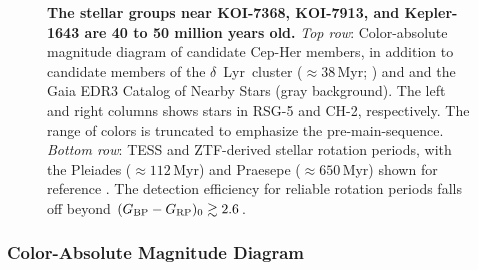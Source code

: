 \documentclass[12pt,twocolumn,linenumbers]{aastex63}
\newcommand{\bpmrpo}{(G_{\rm BP}-G_{\rm RP})_0}
\begin{document}
\begin{figure}[tp]
\begin{center}
		\vspace{-0.6cm}
	\end{center}
	\vspace{-0.7cm}
	\caption{
		{\bf The stellar groups near KOI-7368, KOI-7913, and Kepler-1643
    are 40 to 50 million years old.} 
    {\it Top row}: 
    Color-absolute magnitude diagram of candidate Cep-Her members, in
    addition to candidate members of the $\delta$~Lyr~cluster
    ($\approx38$\,Myr; \citealt{bouma_kep1627_2022}) and and the Gaia
    EDR3 Catalog of Nearby Stars (gray background).  The left and
    right columns shows stars in RSG-5 and CH-2, respectively.  The
    range of colors is truncated to emphasize the pre-main-sequence.
    {\it Bottom row}:
    TESS and ZTF-derived stellar rotation periods, with the Pleiades
    ($\approx 112$\,Myr) and Praesepe ($\approx 650$\,Myr) shown for reference
    \citep{rebull_rotation_2016a,douglas_poking_2017}.
    The detection efficiency for reliable rotation periods falls off
    beyond $\bpmrpo \gtrsim 2.6$.
	\label{fig:age}
	}
\end{figure}

\subsubsection{Color-Absolute Magnitude Diagram}
\label{sec:camd}
\end{document}
